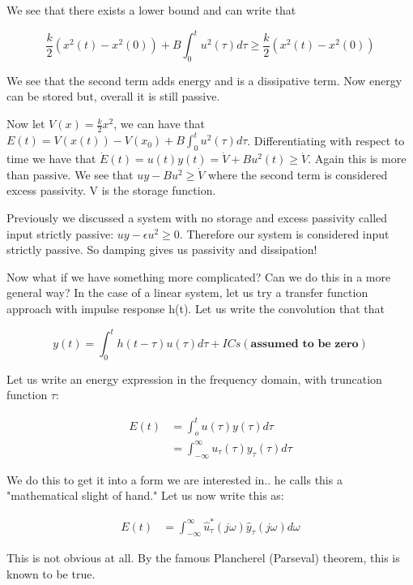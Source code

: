 \documentclass[11pt]{article}
\begin{document}
 We see that there exists a lower bound and can write that

 \begin{equation}
 	 \frac{k}{2}(x^2(t) - x^2(0)) + B\int_0^t u^2(\tau)d\tau \geq \frac{k}{2}(x^2(t) - x^2(0))
 \end{equation}

 We see that the second term adds energy and is a dissipative term. Now energy can be stored but, overall it is still passive.

 Now let $V(x) = \frac{k}{2}x^2$, we can have that $E(t) = V(x(t)) - V(x_0) + B\int_0^t u^2(\tau)d\tau $. Differentiating with respect to time we have that $\dot{E}(t) = u(t)y(t) = \dot{V} + Bu^2(t) \geq \dot{V} $. Again this is more than passive. We see that $uy -Bu^2 \geq \dot{V}$ where the second term is considered excess passivity. V is the storage function.

 Previously we discussed a system with no storage and excess passivity called input strictly passive: $uy - \epsilon u^2 \geq 0$. Therefore our system is considered input strictly passive. So damping gives us passivity and dissipation!

Now what if we have something more complicated? Can we do this in a more general way? In the case of a linear system, let us try a transfer function approach with impulse response h(t). Let us write the convolution that that

\begin{equation}
	y(t) = \int_0^t h(t-\tau)u(\tau)d\tau + ICs (\textbf{assumed to be zero})
\end{equation}

Let us write an energy expression in the frequency domain, with truncation function $\tau$:

\begin{align}
	E(t) &= \int_o^t u(\tau)y(\tau) d\tau \\
	&= \int_{-\infty}^\infty u_\tau (\tau) y_\tau (\tau) d\tau
\end{align}

We do this to get it into a form we are interested in.. he calls this a "mathematical slight of hand." Let us now write this as:

\begin{align}
	E(t) &= \int_{-\infty}^\infty \hat{u}_\tau^* (j\omega) \hat{y}_\tau (j\omega) d\omega
\end{align}

This is not obvious at all. By the famous Plancherel (Parseval) theorem, this is known to be true.
\end{document}
